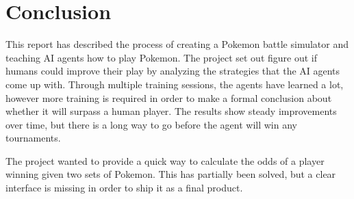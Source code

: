 \chapter{Conclusion}
\label{chap:conclusion}

This report has described the process of creating a Pokemon battle simulator and teaching AI agents how to play Pokemon.
The project set out figure out if humans could improve their play by analyzing the strategies that the AI agents come up
with. Through multiple training sessions, the agents have learned a lot, however more training is required in order to 
make a formal conclusion about whether it will surpass a human player. The results show steady improvements over time, but
there is a long way to go before the agent will win any tournaments.

The project wanted to provide a quick way to calculate the odds of a player winning given two sets of Pokemon. This has
partially been solved, but a clear interface is missing in order to ship it as a final product.
